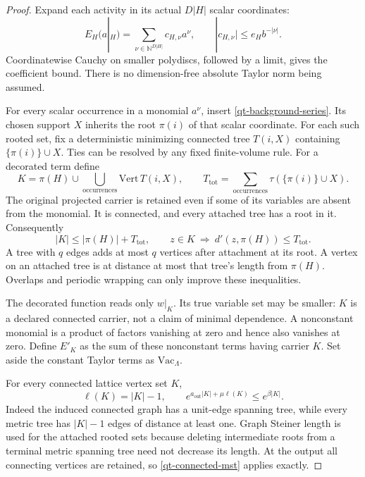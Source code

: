 \begin{proof}
Expand each activity in its actual $D|H|$ scalar coordinates:
\begin{equation}\label{qt-taylor}
 E_H(a|_H)=\sum_{\nu\in\mathbb N^{D|H|}}c_{H,\nu}a^\nu,
 \qquad |c_{H,\nu}|\le e_H b^{-|\nu|}.
\end{equation}
Coordinatewise Cauchy on smaller polydiscs, followed by a limit,
gives the coefficient bound. There is no dimension-free absolute
Taylor norm being assumed.

For every scalar occurrence in a monomial $a^\nu$, insert
\eqref{qt-background-series}. Its chosen support $X$ inherits the
root $\pi(i)$ of that scalar coordinate. For each such rooted set,
fix a deterministic minimizing connected tree $T(i,X)$ containing
$\{\pi(i)\}\cup X$. Ties can be resolved by any fixed finite-volume
rule. For a decorated term define
\begin{equation}\label{qt-hull}
 K=\pi(H)\cup\bigcup_{\text{occurrences}}\mathrm{Vert}\,T(i,X),
 \qquad T_{\mathrm{tot}}
       =\sum_{\text{occurrences}}\tau(\{\pi(i)\}\cup X).
\end{equation}
The original projected carrier is retained even if some of its
variables are absent from the monomial. It is connected, and every
attached tree has a root in it. Consequently
\begin{equation}\label{qt-hull-geometry}
 |K|\le|\pi(H)|+T_{\mathrm{tot}},\qquad
 z\in K\ \Longrightarrow\ d'(z,\pi(H))\le T_{\mathrm{tot}}.
\end{equation}
A tree with $q$ edges adds at most $q$ vertices after attachment at
its root. A vertex on an attached tree is at distance at most that
tree's length from $\pi(H)$. Overlaps and periodic wrapping can
only improve these inequalities.

The decorated function reads only $w|_K$. Its true variable set may
be smaller: $K$ is a declared connected carrier, not a claim of
minimal dependence. A nonconstant monomial is a product of factors
vanishing at zero and hence also vanishes at zero. Define $E'_K$ as
the sum of these nonconstant terms having carrier $K$. Set aside
the constant Taylor terms as $\mathrm{Vac}_\Lambda$.

For every connected lattice vertex set $K$,
\begin{equation}\label{qt-connected-mst}
 \ell(K)=|K|-1,
 \qquad e^{a_{\mathrm{out}}|K|+\mu\ell(K)}\le e^{\beta|K|}.
\end{equation}
Indeed the induced connected graph has a unit-edge spanning tree,
while every metric tree has $|K|-1$ edges of distance at least one.
Graph Steiner length is used for the attached rooted sets because
deleting intermediate roots from a terminal metric spanning tree
need not decrease its length. At the output all connecting vertices
are retained, so \eqref{qt-connected-mst} applies exactly.


\end{proof}

